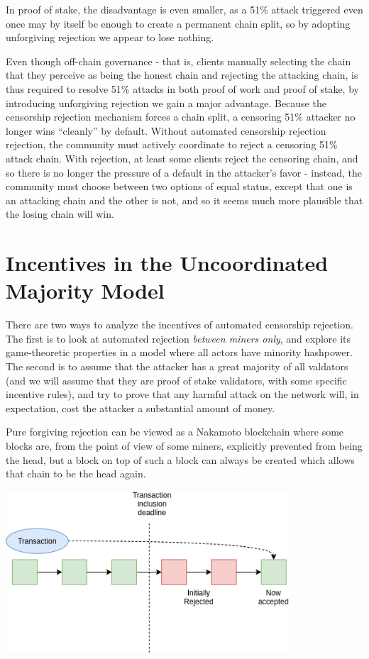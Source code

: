 \documentclass[12pt]{article}
\begin{document}
In proof of stake, the disadvantage is even smaller, as a 51\% attack triggered even once may by itself be enough to create a permanent chain split, so by adopting unforgiving rejection we appear to lose nothing.

Even though off-chain governance - that is, clients manually selecting the chain that they perceive as being the honest chain and rejecting the attacking chain, is thus required to resolve 51\% attacks in both proof of work and proof of stake, by introducing unforgiving rejection we gain a major advantage. Because the censorship rejection mechanism forces a chain split, a censoring 51\% attacker no longer wins ``cleanly'' by default. Without automated censorship rejection rejection, the community must actively coordinate to reject a censoring 51\% attack chain. With rejection, at least some clients reject the censoring chain, and so there is no longer the pressure of a default in the attacker's favor - instead, the community must choose between two options of equal status, except that one is an attacking chain and the other is not, and so it seems much more plausible that the losing chain will win.

\section{Incentives in the Uncoordinated Majority Model}

There are two ways to analyze the incentives of automated censorship rejection. The first is to look at automated rejection \textit{between miners only}, and explore its game-theoretic properties in a model where all actors have minority hashpower. The second is to assume that the attacker has a great majority of all valdators (and we will assume that they are proof of stake validators, with some specific incentive rules), and try to prove that any harmful attack on the network will, in expectation, cost the attacker a substantial amount of money.

Pure forgiving rejection can be viewed as a Nakamoto blockchain where some blocks are, from the point of view of some miners, explicitly prevented from being the head, but a block on top of such a block can always be created which allows that chain to be the head again.

\includegraphics[width=400px]{Censorship3p5.png}
\end{document}
